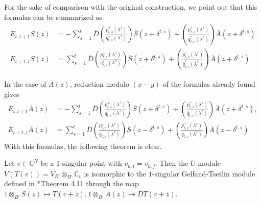 \documentclass[11pt,fleqn]{article}
\newcommand\CC{\mathbb C}
\newcommand\ot{\otimes}
\begin{document}
For the sake of comparison with the original construction, we point out that
this formulas can be summarized as
\begin{align*}
E_{t,t+1} S(z) 
	&= -\sum_{s=1}^t \overline D\left(
		\frac{p^+_{t,s}(\lambda^z)}{q^*_{t,s}(\lambda^z)}
	\right) \overline S(z + \delta^{t,s})
	+ \left(
		\frac{\overline p^+_{t,s}(\lambda^z)}{\overline q^*_{t,s}(\lambda^z)}
	\right) \overline A(z + \delta^{t,s}) \\
E_{t+1,t} S(z) 
	&= \sum_{s=1}^t \overline D\left(
		\frac{p^-_{t,s}(\lambda^z)}{q^*_{t,s}(\lambda^z)}
	\right) \overline S(z + \delta^{t,s})
	+ \left(
		\frac{\overline p^-_{t,s}(\lambda^z)}{\overline q^*_{t,s}(\lambda^z)}
	\right) \overline A(z + \delta^{t,s})
\end{align*}

In the case of $\overline A(z)$, reduction modulo $(x-y)$ of the formulas 
already found gives
\begin{align*}
E_{t,t+1} \overline A(z)
	&= - \sum_{s=1}^t \overline D \left(
		\frac{p_{t,s}^+(\lambda^z)}{q_{t,s}(\lambda^z)}
	\right) \overline S(z + \delta^{t,s}) 
	+ \left( 
		\frac{\overline p_{t,s}^+(\lambda^z)}{\overline q_{t,s}(\lambda^z)}
	\right) \overline A(z+\delta^{t,s}), \\
E_{t+1,t} \overline A(z)
	&= \sum_{s=1}^t \overline D \left(
		\frac{p_{t,s}^-(\lambda^z)}{q_{t,s}(\lambda^z)}
	\right) \overline S(z - \delta^{t,s}) 
	+ \left( 
		\frac{\overline p_{t,s}^-(\lambda^z)}{\overline q_{t,s}(\lambda^z)}
	\right) \overline A(z-\delta^{t,s})
\end{align*}
With this formulas, the following theorem is clear.
\begin{Theorem}
Let $v \in \CC^N$ be a $1$-singular point with $v_{k,i} = v_{k,j}$. Then the
$U$-module $V(T(v)) = V_{B'} \ot_{B'} \CC_v$ is isomorphic to the $1$-singular
Gelfand-Tsetlin module defined in \cite{FGR-singular-gt}*{Theorem 4.11} 
through the map $1 \ot_{B'} \overline S(z) \mapsto T(v + z), 1 \ot_{B'} 
\overline A(z) \mapsto DT(v+z)$.
\end{Theorem}
\end{document}
